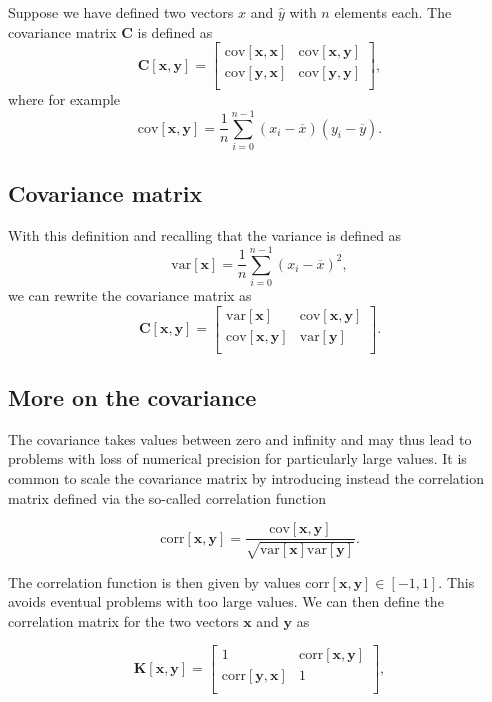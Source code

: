 \documentclass[%
oneside,                 %
final,                   %
10pt]{article}
\begin{document}
Suppose we have defined two vectors
$\hat{x}$ and $\hat{y}$ with $n$ elements each. The covariance matrix $\bm{C}$ is defined as 
\[
\bm{C}[\bm{x},\bm{y}] = \begin{bmatrix} \mathrm{cov}[\bm{x},\bm{x}] & \mathrm{cov}[\bm{x},\bm{y}] \\
                              \mathrm{cov}[\bm{y},\bm{x}] & \mathrm{cov}[\bm{y},\bm{y}] \\
             \end{bmatrix},
\]
where for example
\[
\mathrm{cov}[\bm{x},\bm{y}] =\frac{1}{n} \sum_{i=0}^{n-1}(x_i- \overline{x})(y_i- \overline{y}).
\]

\subsection{Covariance matrix}

With this definition and recalling that the variance is defined as
\[
\mathrm{var}[\bm{x}]=\frac{1}{n} \sum_{i=0}^{n-1}(x_i- \overline{x})^2,
\]
we can rewrite the covariance matrix as 
\[
\bm{C}[\bm{x},\bm{y}] = \begin{bmatrix} \mathrm{var}[\bm{x}] & \mathrm{cov}[\bm{x},\bm{y}] \\
                              \mathrm{cov}[\bm{x},\bm{y}] & \mathrm{var}[\bm{y}] \\
             \end{bmatrix}.
\]

\subsection{More on the covariance}
The covariance takes values between zero and infinity and may thus
lead to problems with loss of numerical precision for particularly
large values. It is common to scale the covariance matrix by
introducing instead the correlation matrix defined via the so-called
correlation function

\[
\mathrm{corr}[\bm{x},\bm{y}]=\frac{\mathrm{cov}[\bm{x},\bm{y}]}{\sqrt{\mathrm{var}[\bm{x}] \mathrm{var}[\bm{y}]}}.
\]

The correlation function is then given by values $\mathrm{corr}[\bm{x},\bm{y}]
\in [-1,1]$. This avoids eventual problems with too large values. We
can then define the correlation matrix for the two vectors $\bm{x}$
and $\bm{y}$ as

\[
\bm{K}[\bm{x},\bm{y}] = \begin{bmatrix} 1 & \mathrm{corr}[\bm{x},\bm{y}] \\
                              \mathrm{corr}[\bm{y},\bm{x}] & 1 \\
             \end{bmatrix},
\]
\end{document}
